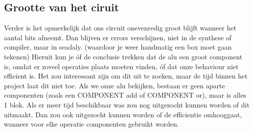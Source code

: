 \documentclass{article}
\begin{document}
\subsection{Grootte van het ciruit}
Verder is het opmerkelijk dat ons circuit onevenredig groot blijft wanneer het aantal bits afneemt. Dan blijven er errors verschijnen, niet in de synthese of compiler, maar in seadaly.  (waardoor je weer handmatig een box moet gaan tekenen) Hieruit kun je óf de conclusie trekken dat de alu een groot component is, omdat er zoveel operaties plaats moeten vinden, óf dat onze behaviour niet efficient is. Het zou interessant zijn om dit uit te zoeken, maar de tijd binnen het project laat dit niet toe. Als we onze alu bekijken, bestaan er geen aparte componenten (zoals een COMPONENT add of COMPONENT or), maar is alles 1 blok.  Als er meer tijd beschikbaar was zou nog uitgezocht kunnen worden of dit uitmaakt. Dan zou ook uitgezocht kunnen worden of de efficientie omhooggaat, wanneer voor elke operatie componenten gebruikt worden. 
\end{document}
